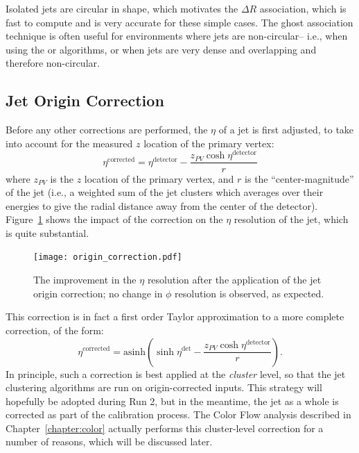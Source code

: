 Isolated \antikt jets are circular in shape, which motivates the $\Delta R$ association, which is fast to compute and is very accurate for these simple cases. The ghost association technique is often useful for environments where jets are non-circular-- i.e., when using the \kt or \ca algorithms, or when jets are very dense and overlapping and therefore non-circular.



\subsection{Jet Origin Correction}
\label{jet-reconstruction:origin}
Before any other corrections are performed, the $\eta$ of a jet is first adjusted, to take into account for the measured $z$ location of the primary vertex:
%
\begin{equation}
\eta^\mathrm{corrected} = \eta^\mathrm{detector} - \frac{z_{PV} \cosh \eta^\mathrm{detector} }{r}
\end{equation}
%
where $z_{PV}$ is the $z$ location of the primary vertex, and $r$ is the ``center-magnitude'' of the jet (i.e., a weighted sum of the jet clusters which averages over their energies to give the radial distance away from the center of the detector). Figure~\ref{fig:jet-reconstruction:origin_correction} shows the impact of the correction on the $\eta$ resolution of the jet, which is quite substantial.


\begin{figure}
\centering
\texttt{[image: origin\_correction.pdf]}
\label{fig:jet-reconstruction:origin_correction}
\caption{The improvement in the $\eta$ resolution after the application of the jet origin correction; no change in $\phi$ resolution is observed, as expected.}
\end{figure}


This correction is in fact a first order Taylor approximation to a more complete correction, of the form:
%
\begin{equation}
\eta^\mathrm{corrected} = \mathrm{asinh} \left(\sinh \eta^\mathrm{det} - \frac{z_{PV} \cosh \eta^\mathrm{detector}}{r}  \right).
\end{equation}
%
In principle, such a correction is best applied at the \textit{cluster} level, so that the jet clustering algorithms are run on origin-corrected inputs. This strategy will hopefully be adopted during Run 2, but in the meantime, the jet as a whole is corrected as part of the calibration process. The Color Flow analysis described in Chapter~\ref{chapter:color} actually performs this cluster-level correction for a number of reasons, which will be discussed later.


